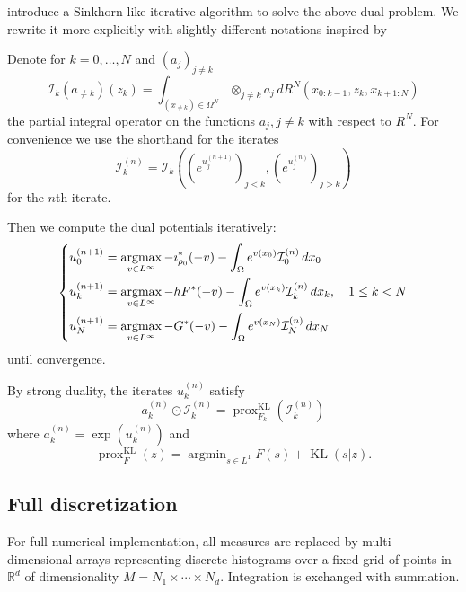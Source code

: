\documentclass{article}
\newcommand{\RR}{\mathbb{R}}
\newcommand{\calI}{\mathcal{I}}
\DeclareMathOperator*{\argmin}{argmin}
\DeclareMathOperator*{\argmax}{argmax}
\DeclareMathOperator{\KL}{KL}
\DeclareMathOperator{\prox}{prox}
\begin{document}
    \textcite{benamou2018entropy} introduce a Sinkhorn-like iterative algorithm to solve the above dual problem. We rewrite it more explicitly with slightly different notations inspired by \cite{chizat2016scaling}
    \begin{thmalgo}
   	Denote for $k=0,\ldots,N$ and $(a_j)_{j\neq k}$
   	\[
   		\calI_k(a_{\neq k})(z_k) = 
   		\int_{(x_{\neq k}) \in\Omega^N} \otimes_{j\neq k} a_j\,
   		dR^N(x_{0:k-1}, z_k, x_{k+1:N})
   	\]
   	the partial integral operator on the functions $a_j,j\neq k$ with respect to $R^N$.
   	For convenience we use the shorthand for the iterates
   	\[
   		\calI_k^{(n)} = \calI_k\left(\left(e^{u^{(n+1)}_j}\right)_{j<k}, \left(e^{u^{(n)}_j}\right)_{j>k}\right)
   	\]
   	for the $n$th iterate.
   	
   	Then we compute the dual potentials iteratively:
   	\begin{equation}
	   	\begin{dcases}
	   	u_0^{(n+1)} = \argmax_{v \in L^\infty} -\imath_{\rho_0}^*(-v) - \int_{\Omega} e^{v(x_0)} \calI_0^{(n)} \,dx_0 \\
	   	u_k^{(n+1)} = \argmax_{v \in L^\infty} -hF^*(-v) - \int_{\Omega} e^{v(x_k)} \calI_k^{(n)} \,dx_k,\quad 1\leq k < N \\
	   	u_N^{(n+1)} = \argmax_{v \in L^\infty} -G^*(-v) - \int_{\Omega} e^{v(x_N)} \calI_N^{(n)} \,dx_N
	   	\end{dcases}
   	\end{equation}
  	until convergence.
	
	By strong duality, the iterates $u_k^{(n)}$ satisfy
	\[
		a_k^{(n)}\odot \calI_k^{(n)} =
		\prox_{F_k}^{\KL}(\calI_k^{(n)})
	\]
	where $a^{(n)}_k = \exp(u^{(n)}_k)$ and
	\[
		\prox_F^{\KL}(z) = \argmin_{s\in L^1} F(s) + \KL(s|z).
	\]
	\end{thmalgo}
    
    
    
    
    
    \subsection{Full discretization}
    
    For full numerical implementation, all measures are replaced by multi-dimensional arrays representing discrete histograms over a fixed grid of points in $\RR^d$ of dimensionality $M = N_1\times\cdots\times N_d$. Integration is exchanged with summation.
    
    
    
\end{document}
